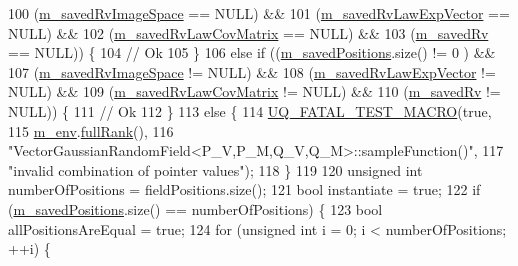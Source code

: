 \begin{DoxyCode}
100       (\hyperlink{class_q_u_e_s_o_1_1_vector_gaussian_random_field_a8fba910fff533442361ad7bd93e5706b}{m\_savedRvImageSpace}     == NULL) &&
101       (\hyperlink{class_q_u_e_s_o_1_1_vector_gaussian_random_field_a544ce2c5ff0329b6fb7c625e71eb3576}{m\_savedRvLawExpVector}   == NULL) &&
102       (\hyperlink{class_q_u_e_s_o_1_1_vector_gaussian_random_field_a0a07c1eec3d56ef764b13586a36921d3}{m\_savedRvLawCovMatrix}   == NULL) &&
103       (\hyperlink{class_q_u_e_s_o_1_1_vector_gaussian_random_field_a7e2ed5d146f65c8c4ddbd1d4e496647d}{m\_savedRv}               == NULL)) \{
104     \textcolor{comment}{// Ok}
105   \}
106   \textcolor{keywordflow}{else} \textcolor{keywordflow}{if} ((\hyperlink{class_q_u_e_s_o_1_1_vector_gaussian_random_field_aa51f310fb54dd4807522a0e72be61acd}{m\_savedPositions}.size() != 0   ) &&
107            (\hyperlink{class_q_u_e_s_o_1_1_vector_gaussian_random_field_a8fba910fff533442361ad7bd93e5706b}{m\_savedRvImageSpace}     != NULL) &&
108            (\hyperlink{class_q_u_e_s_o_1_1_vector_gaussian_random_field_a544ce2c5ff0329b6fb7c625e71eb3576}{m\_savedRvLawExpVector}   != NULL) &&
109            (\hyperlink{class_q_u_e_s_o_1_1_vector_gaussian_random_field_a0a07c1eec3d56ef764b13586a36921d3}{m\_savedRvLawCovMatrix}   != NULL) &&
110            (\hyperlink{class_q_u_e_s_o_1_1_vector_gaussian_random_field_a7e2ed5d146f65c8c4ddbd1d4e496647d}{m\_savedRv}               != NULL)) \{
111     \textcolor{comment}{// Ok}
112   \}
113   \textcolor{keywordflow}{else} \{
114     \hyperlink{_defines_8h_a56d63d18d0a6d45757de47fcc06f574d}{UQ\_FATAL\_TEST\_MACRO}(\textcolor{keyword}{true},
115                         \hyperlink{class_q_u_e_s_o_1_1_vector_gaussian_random_field_ab4ad80cb336314fd0025abf0d37c5aa0}{m\_env}.\hyperlink{class_q_u_e_s_o_1_1_base_environment_a84a239e42ae443cf71db6e03e8159620}{fullRank}(),
116                         \textcolor{stringliteral}{"VectorGaussianRandomField<P\_V,P\_M,Q\_V,Q\_M>::sampleFunction()"},
117                         \textcolor{stringliteral}{"invalid combination of pointer values"});
118   \}
119 
120   \textcolor{keywordtype}{unsigned} \textcolor{keywordtype}{int} numberOfPositions = fieldPositions.size();
121   \textcolor{keywordtype}{bool} instantiate = \textcolor{keyword}{true};
122   \textcolor{keywordflow}{if} (\hyperlink{class_q_u_e_s_o_1_1_vector_gaussian_random_field_aa51f310fb54dd4807522a0e72be61acd}{m\_savedPositions}.size() == numberOfPositions) \{
123     \textcolor{keywordtype}{bool} allPositionsAreEqual = \textcolor{keyword}{true};
124     \textcolor{keywordflow}{for} (\textcolor{keywordtype}{unsigned} \textcolor{keywordtype}{int} i = 0; i < numberOfPositions; ++i) \{

\end{DoxyCode}
